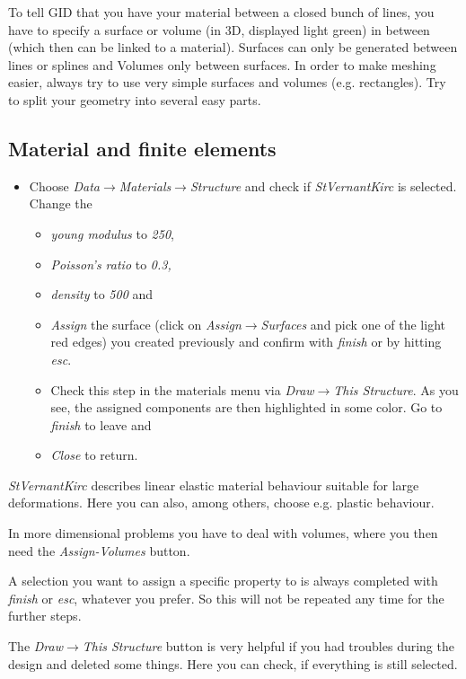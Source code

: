 To tell GID that you have your material between a closed bunch of lines, you
have to specify a surface or volume (in 3D, displayed light green)
in between (which then can be linked to a material). Surfaces can
only be generated between lines or splines and Volumes only between
surfaces. In order to make meshing easier, always try to use very
simple surfaces and volumes (e.g. rectangles). Try to split your geometry
into several easy parts.


\subsection{Material and finite elements}

\begin{itemize}
\item Choose \emph{Data$\to$Materials$\to$Structure} and check if \emph{StVernantKirc}
is selected. Change the

\begin{itemize}
\item \emph{young modulus} to \emph{250},
\item \emph{Poisson's ratio} to \emph{0.3, }
\item \emph{density} to \emph{500} and
\item \emph{Assign} the surface (click on \emph{Assign$\to$Surfaces} and
pick one of the light red edges) you created previously and confirm with \emph{finish} or by hitting \emph{esc}.
\item Check this step in the materials menu via \emph{Draw$\to$This Structure}.
As you see, the assigned components are then highlighted in some color.
Go to \emph{finish} to leave and
\item \emph{Close} to return.
\end{itemize}
\end{itemize}

\emph{StVernantKirc} describes linear elastic material behaviour suitable for large deformations.
Here you can also, among others, choose e.g. plastic behaviour.

In more dimensional problems you have to deal with volumes, where
you then need the \emph{Assign-Volumes} button.

A selection you want to assign a specific property to is always completed with \emph{finish} or \emph{esc}, whatever you prefer. So this will not be repeated any time for the further steps.


The \emph{Draw$\to$This Structure} button is very helpful if you
had troubles during the design and deleted some things. Here you can
check, if everything is still selected.

